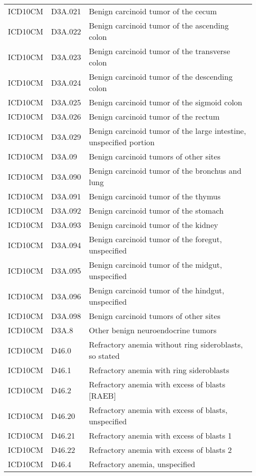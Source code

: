 \begin{longtable}{p{}p{}p{}}
  ICD10CM & D3A.021 & Benign carcinoid tumor of the cecum \\ 
  ICD10CM & D3A.022 & Benign carcinoid tumor of the ascending colon \\ 
  ICD10CM & D3A.023 & Benign carcinoid tumor of the transverse colon \\ 
  ICD10CM & D3A.024 & Benign carcinoid tumor of the descending colon \\ 
  ICD10CM & D3A.025 & Benign carcinoid tumor of the sigmoid colon \\ 
  ICD10CM & D3A.026 & Benign carcinoid tumor of the rectum \\ 
  ICD10CM & D3A.029 & Benign carcinoid tumor of the large intestine, unspecified portion \\ 
  ICD10CM & D3A.09 & Benign carcinoid tumors of other sites \\ 
  ICD10CM & D3A.090 & Benign carcinoid tumor of the bronchus and lung \\ 
  ICD10CM & D3A.091 & Benign carcinoid tumor of the thymus \\ 
  ICD10CM & D3A.092 & Benign carcinoid tumor of the stomach \\ 
  ICD10CM & D3A.093 & Benign carcinoid tumor of the kidney \\ 
  ICD10CM & D3A.094 & Benign carcinoid tumor of the foregut, unspecified \\ 
  ICD10CM & D3A.095 & Benign carcinoid tumor of the midgut, unspecified \\ 
  ICD10CM & D3A.096 & Benign carcinoid tumor of the hindgut, unspecified \\ 
  ICD10CM & D3A.098 & Benign carcinoid tumors of other sites \\ 
  ICD10CM & D3A.8 & Other benign neuroendocrine tumors \\ 
  ICD10CM & D46.0 & Refractory anemia without ring sideroblasts, so stated \\ 
  ICD10CM & D46.1 & Refractory anemia with ring sideroblasts \\ 
  ICD10CM & D46.2 & Refractory anemia with excess of blasts [RAEB] \\ 
  ICD10CM & D46.20 & Refractory anemia with excess of blasts, unspecified \\ 
  ICD10CM & D46.21 & Refractory anemia with excess of blasts 1 \\ 
  ICD10CM & D46.22 & Refractory anemia with excess of blasts 2 \\ 
  ICD10CM & D46.4 & Refractory anemia, unspecified \\ 

\end{longtable}
